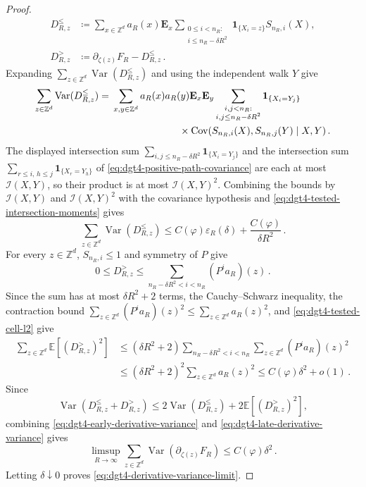 \documentclass[11pt]{amsart}
\theoremstyle{plain}
\theoremstyle{definition}
\newcommand{\Z}{\mathbb{Z}}
\newcommand{\E}{\mathbb{E}}
\DeclareMathOperator{\Var}{Var}
\DeclareMathOperator{\Cov}{Cov}
\newcommand{\one}{\mathbf{1}}
\begin{document}
\begin{proof}
\[\begin{aligned}
		D^{\leq}_{R,z}
		&\coloneqq
		\sum_{x\in\Z^d}a_R(x)\mathbf E_x
		\sum_{\substack{0\leq i<n_R:\\i\leq n_R-\delta R^2}}
		\one_{\{X_i=z\}}S_{n_R,i}(X),\\
		D^{>}_{R,z}
		&\coloneqq
		\partial_{\zeta(z)}F_R-D^{\leq}_{R,z}\, .
	\end{aligned}
	\]
	Expanding $\sum_{z\in\Z^d}\Var(D^{\leq}_{R,z})$ and using the independent walk
	$Y$ give
	\[
	\begin{aligned}
		\sum_{z\in\Z^d}\Var(D^{\leq}_{R,z})
		={}&
		\sum_{x,y\in\Z^d}a_R(x)a_R(y)\mathbf E_x\mathbf E_y
		\sum_{\substack{i,j<n_R:\\i,j\leq n_R-\delta R^2}}
		\one_{\{X_i=Y_j\}}\\
		&\hspace{24mm}\times
		\Cov(S_{n_R,i}(X),S_{n_R,j}(Y)\mid X,Y)\, .
	\end{aligned}
	\]
	The displayed intersection sum $\sum_{i,j\leq n_R-\delta R^2}\one_{\{X_i=Y_j\}}$ and the intersection sum
	$\sum_{r\leq i,\,h\leq j}\one_{\{X_r=Y_h\}}$ of \eqref{eq:dgt4-positive-path-covariance} are each at most
	$\mathcal I(X,Y)$, so their product is at most $\mathcal I(X,Y)^2$.
	Combining the bounds by $\mathcal I(X,Y)$ and $\mathcal I(X,Y)^2$ with
	the covariance hypothesis and
	\eqref{eq:dgt4-tested-intersection-moments} gives
	\begin{equation}\label{eq:dgt4-early-derivative-variance}
		\sum_{z\in\Z^d}\Var(D^{\leq}_{R,z})
		\leq C(\varphi)\varepsilon_R(\delta)
		+\frac{C(\varphi)}{\delta R^2}\, .
	\end{equation}
	For every $z\in\Z^d$, $S_{n_R,i}\leq1$ and symmetry of $P$ give
	\[
		0\leq D^{>}_{R,z}
		\leq\sum_{n_R-\delta R^2<i<n_R}(P^ia_R)(z)\, .
	\]
	Since the sum has at most $\delta R^2+2$ terms, the Cauchy--Schwarz inequality, the contraction bound
	$\sum_{z\in\Z^d}(P^ia_R)(z)^2\leq\sum_{z\in\Z^d}a_R(z)^2$, and \eqref{eq:dgt4-tested-cell-l2}
	give
	\begin{equation}\label{eq:dgt4-late-derivative-variance}
	\begin{aligned}
		\sum_{z\in\Z^d}\E[(D^{>}_{R,z})^2]
		&\leq(\delta R^2+2)\sum_{n_R-\delta R^2<i<n_R}\sum_{z\in\Z^d}(P^ia_R)(z)^2\\
		&\leq(\delta R^2+2)^2\sum_{z\in\Z^d}a_R(z)^2
		\leq C(\varphi)\delta^2+o(1)\, .
	\end{aligned}
	\end{equation}
	Since
	\[
		\Var(D^{\leq}_{R,z}+D^{>}_{R,z})
		\leq
		2\Var(D^{\leq}_{R,z})+2\E[(D^{>}_{R,z})^2],
	\]
	combining \eqref{eq:dgt4-early-derivative-variance} and
	\eqref{eq:dgt4-late-derivative-variance} gives
	\[
		\limsup_{R\to\infty}
		\sum_{z\in\Z^d}\Var(\partial_{\zeta(z)}F_R)
		\leq C(\varphi)\delta^2\, .
	\]
	Letting $\delta\downarrow0$ proves
	\eqref{eq:dgt4-derivative-variance-limit}.


\end{proof}
\end{document}
